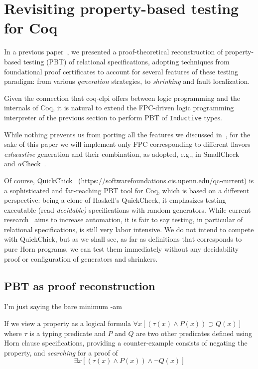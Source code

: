 \section{Revisiting property-based testing for Coq}

In a previous paper~\cite{blanco19ppdp}, we presented a
proof-theoretical reconstruction of property-based testing (PBT) of
relational specifications, adopting techniques from foundational proof
certificates to account for several features of these testing
paradigm: from various \emph{generation} strategies, to
\emph{shrinking} and fault localization.

Given the connection that \textsf{coq-elpi} offers between logic
programming and the internals of Coq, it is natural to extend the FPC-driven logic programming interpreter of the previous section to perform PBT of \lstinline{Inductive} types.

While nothing prevents us from porting all the features we discussed in~\cite{blanco19ppdp}, for the sake of this paper we will implement only FPC corresponding to different flavors \emph{exhaustive} generation and their combination, as adopted, e.g., in SmallCheck~\cite{smallcheck} and  $\alpha$Check~\cite{cheney_momigliano_2017}.

Of course, \textsf{QuickChick}~\cite{QChick}
(\url{https://softwarefoundations.cis.upenn.edu/qc-current}) is a
sophisticated and far-reaching PBT tool for Coq, which is based on a
different perspective: being a clone of Haskell's QuickCheck, it
emphasizes testing executable (read \emph{decidable)} specifications
with random generators. While current research~\cite{LampropoulosPP18} aims to increase automation, it is fair to say testing, in particular of  relational specifications, is still very labor intensive. We do not intend to compete with  \textsf{QuickChick}, but as we shall see, as far as  definitions that corresponds to pure Horn programs, we can test them immediately without any decidability proof or configuration of generators and shrinkers.


\subsection{PBT as proof reconstruction}
\label{ssec:pbt-lp}

\begin{metanote}
  I'm just saying the bare minimum -am
\end{metanote}

 If we view  a property as a logical formula
\(\forall x [(\tau(x)\wedge P(x)) \supset Q(x)]\) where $\tau$ is a
typing predicate and $P$ and $Q$ are two other predicates defined
using Horn clause specifications, providing a counter-example
consists of  negating the property, and \emph{searching} for a proof of
\[
  \exists x [(\tau(x)\wedge P(x)) \wedge \neg Q(x)]
  \tag{*}\label{eq:full}
\]


